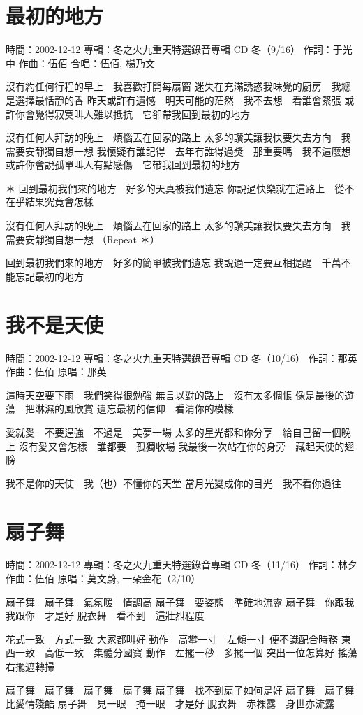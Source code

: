 \documentclass[UTF8,a4paper,oneside,twocolumn,12pt]{ctexbook}
\newcommand{\infopair}[2]{\textbullet #1：#2}
\newcommand{\zc}[1][伍佰]{\infopair{作詞}{#1}}
\newcommand{\zq}[1][伍佰]{\infopair{作曲}{#1}}
\newcommand{\zj}[1]{\infopair{專輯}{#1}}
\newcommand{\yc}[1]{\infopair{原唱}{#1}}
\newcommand{\sj}[1]{\infopair{時間}{#1}}
\newenvironment{info}{\begin{flushleft}\kaishu
	}
	{\end{flushleft}\normalsize\yahei\par}
\newenvironment{lyric}{
	}
{}
\begin{document}
\section{最初的地方}
\begin{info}
	\sj{2002-12-12}
	\zj{冬之火九重天特選錄音專輯 CD 冬（9/16）}
	\zc[于光中]
	\zq
	\infopair{合唱}{伍佰, 楊乃文}
\end{info}
\begin{lyric}
	沒有約任何行程的早上　我喜歡打開每扇窗
	迷失在充滿誘惑我味覺的廚房　我總是選擇最恬靜的香
	昨天或許有遺憾　明天可能的茫然　我不去想　看誰會緊張
	或許你會覺得寂寞叫人難以抵抗　它卻帶我回到最初的地方

	沒有任何人拜訪的晚上　煩惱丟在回家的路上
	太多的讚美讓我快要失去方向　我需要安靜獨自想一想
	我懷疑有誰記得　去年有誰得過獎　那重要嗎　我不這麼想
	或許你會說孤單叫人有點感傷　它帶我回到最初的地方

	＊
	回到最初我們來的地方　好多的天真被我們遺忘
	你說過快樂就在這路上　從不在乎結果究竟會怎樣

	沒有任何人拜訪的晚上　煩惱丟在回家的路上
	太多的讚美讓我快要失去方向　我需要安靜獨自想一想
	（Repeat ＊）

	回到最初我們來的地方　好多的簡單被我們遺忘
	我說過一定要互相提醒　千萬不能忘記最初的地方
\end{lyric}

\section{我不是天使}
\begin{info}
	\sj{2002-12-12}
	\zj{冬之火九重天特選錄音專輯 CD 冬（10/16）}
	\zc[那英]
	\zq
	\yc{那英}
\end{info}
\begin{lyric}
	這時天空要下雨　我們笑得很勉強
	無言以對的路上　沒有太多惆悵
	像是最後的遊蕩　把淋濕的風欣賞
	遺忘最初的信仰　看清你的模樣

	愛就愛　不要逞強　不過是　美夢一場
	太多的星光都和你分享　給自己留一個晚上
	沒有愛又會怎樣　誰都要　孤獨收場
	我最後一次站在你的身旁　藏起天使的翅膀

	我不是你的天使　我（也）不懂你的天堂
	當月光變成你的目光　我不看你過往
\end{lyric}

\section{扇子舞}
\begin{info}
	\sj{2002-12-12}
	\zj{冬之火九重天特選錄音專輯 CD 冬（11/16）}
	\zc[林夕]
	\zq
	\yc{莫文蔚, 一朵金花（2/10）}
\end{info}
\begin{lyric}
	扇子舞　扇子舞　氣氛暖　情調高
	扇子舞　要姿態　準確地流露
	扇子舞　你跟我　我跟你　才是好
	脫衣舞　看不到　這壯烈程度

	花式一致　方式一致
	大家都叫好
	動作　高攀一寸　左傾一寸
	便不識配合時務
	東西一致　高低一致　集體分國寶
	動作　左擺一秒　多擺一個
	突出一位怎算好
	搖蕩右擺遮轉掃

	扇子舞　扇子舞　扇子舞　扇子舞
	扇子舞　找不到扇子如何是好
	扇子舞　扇子舞比愛情殘酷
	扇子舞　見一眼　掩一眼　才是好
	脫衣舞　赤裸露　身世亦流露
\end{lyric}
\end{document}
